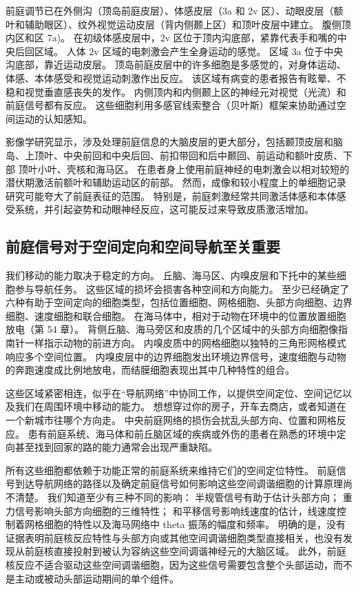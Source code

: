 前庭调节已在外侧沟（顶岛前庭皮层）、体感皮层（3a 和 2v 区）、动眼皮层（额叶和辅助眼区）、纹外视觉运动皮层（背内侧颞上区）和顶叶皮层中建立。 腹侧顶内区和区 7a)。 在初级体感皮层中，2v 区位于顶内沟底部，紧靠代表手和嘴的中央后回区域。 人体 2v 区域的电刺激会产生全身运动的感觉。 区域 3a 位于中央沟底部，靠近运动皮层。 顶岛前庭皮层中的许多细胞是多感觉的，对身体运动、体感、本体感受和视觉运动刺激作出反应。 该区域有病变的患者报告有眩晕、不稳和视觉垂直感丧失的发作。 内侧顶内和内侧颞上区的神经元对视觉（光流）和前庭信号都有反应。 这些细胞利用多感官线索整合（贝叶斯）框架来协助通过空间运动的认知感知。

影像学研究显示，涉及处理前庭信息的大脑皮层的更大部分，包括颞顶皮层和脑岛、上顶叶、中央前回和中央后回、前扣带回和后中颞回、前运动和额叶皮质、下部 顶叶小叶、壳核和海马区。 在患者身上使用前庭神经的电刺激会以相对较短的潜伏期激活前额叶和辅助运动区的前部。 然而，成像和较小程度上的单细胞记录研究可能夸大了前庭表征的范围。 特别是，前庭刺激经常共同激活体感和本体感受系统，并引起姿势和动眼神经反应，这可能反过来导致皮质激活增加。

\subsection{前庭信号对于空间定向和空间导航至关重要}

我们移动的能力取决于稳定的方向。 丘脑、海马区、内嗅皮层和下托中的某些细胞参与导航任务。 这些区域的损坏会损害各种空间和方向能力。 至少已经确定了六种有助于空间定向的细胞类型，包括位置细胞、网格细胞、头部方向细胞、边界细胞、速度细胞和联合细胞。 在海马体中，相对于动物在环境中的位置放置细胞放电（第 54 章）。 背侧丘脑、海马旁区和皮质的几个区域中的头部方向细胞像指南针一样指示动物的前进方向。 内嗅皮质中的网格细胞以独特的三角形网格模式响应多个空间位置。 内嗅皮层中的边界细胞发出环境边界信号，速度细胞与动物的奔跑速度成比例地放电，而结膜细胞表现出其中几种特性的组合。

这些区域紧密相连，似乎在“导航网络”中协同工作，以提供空间定位、空间记忆以及我们在周围环境中移动的能力。 想想穿过你的房子，开车去商店，或者知道在一个新城市往哪个方向走。 中央前庭网络的损伤会扰乱头部方向、位置和网格反应。 患有前庭系统、海马体和前丘脑区域的疾病或外伤的患者在熟悉的环境中定向甚至找到回家的路的能力通常会出现严重缺陷。

所有这些细胞都依赖于功能正常的前庭系统来维持它们的空间定位特性。 前庭信号到达导航网络的路径以及确定前庭信号如何影响这些空间调谐细胞的计算原理尚不清楚。 我们知道至少有三种不同的影响： 半规管信号有助于估计头部方向； 重力信号影响头部方向细胞的三维特性； 和平移信号影响线速度的估计，线速度控制着网格细胞的特性以及海马网络中 theta 振荡的幅度和频率。 明确的是，没有证据表明前庭核反应特性与头部方向或其他空间调谐细胞类型直接相关，也没有发现从前庭核直接投射到被认为容纳这些空间调谐神经元的大脑区域。 此外，前庭核反应不适合驱动这些空间调谐细胞，因为这些信号需要包含整个头部运动，而不是主动或被动头部运动期间的单个组件。


